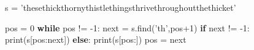 \documentclass[]{article}
\newenvironment{Shaded}{}{}
\newcommand{\DecValTok}[1]{\textcolor[rgb]{0.25,0.63,0.44}{#1}}
\newcommand{\StringTok}[1]{\textcolor[rgb]{0.25,0.44,0.63}{#1}}
\newcommand{\ControlFlowTok}[1]{\textcolor[rgb]{0.00,0.44,0.13}{\textbf{#1}}}
\newcommand{\OperatorTok}[1]{\textcolor[rgb]{0.40,0.40,0.40}{#1}}
\newcommand{\BuiltInTok}[1]{#1}
\newcommand{\NormalTok}[1]{#1}
\begin{document}
\begin{enumerate}
\begin{Shaded}
\begin{Highlighting}[]
\NormalTok{s }\OperatorTok{=} \StringTok{'thesethickthornythistlethingsthrivethroughoutthethicket'}

\NormalTok{pos }\OperatorTok{=} \DecValTok{0}
\ControlFlowTok{while}\NormalTok{ pos }\OperatorTok{!=} \DecValTok{-1}\NormalTok{:}
    \BuiltInTok{next} \OperatorTok{=}\NormalTok{ s.find(}\StringTok{'th'}\NormalTok{,pos}\OperatorTok{+}\DecValTok{1}\NormalTok{)}
    \ControlFlowTok{if} \BuiltInTok{next} \OperatorTok{!=} \DecValTok{-1}\NormalTok{:}
        \BuiltInTok{print}\NormalTok{(s[pos:}\BuiltInTok{next}\NormalTok{])}
    \ControlFlowTok{else}\NormalTok{:}
        \BuiltInTok{print}\NormalTok{(s[pos:])}
\NormalTok{    pos }\OperatorTok{=} \BuiltInTok{next}
\end{Highlighting}
\end{Shaded}
\end{enumerate}
\end{document}
